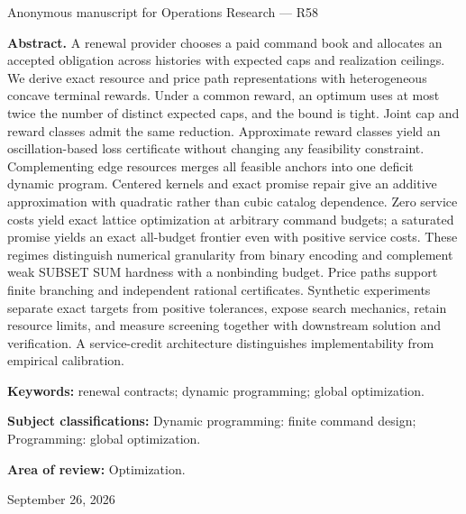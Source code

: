 \documentclass[11pt,letterpaper]{article}
\theoremstyle{definition}\newtheorem{remark}[theorem]{Remark}
\begin{document}
\hypersetup{pageanchor=false}
\begin{titlepage}
\vspace{0.25in}Anonymous manuscript for Operations Research --- R58\par\vspace{0.2in}
\begin{minipage}{\textwidth}\textbf{Abstract.} A renewal provider chooses a paid command book and allocates an accepted obligation across histories with expected caps and realization ceilings. We derive exact resource and price path representations with heterogeneous concave terminal rewards. Under a common reward, an optimum uses at most twice the number of distinct expected caps, and the bound is tight. Joint cap and reward classes admit the same reduction. Approximate reward classes yield an oscillation-based loss certificate without changing any feasibility constraint. Complementing edge resources merges all feasible anchors into one deficit dynamic program. Centered kernels and exact promise repair give an additive approximation with quadratic rather than cubic catalog dependence. Zero service costs yield exact lattice optimization at arbitrary command budgets; a saturated promise yields an exact all-budget frontier even with positive service costs. These regimes distinguish numerical granularity from binary encoding and complement weak SUBSET SUM hardness with a nonbinding budget. Price paths support finite branching and independent rational certificates. Synthetic experiments separate exact targets from positive tolerances, expose search mechanics, retain resource limits, and measure screening together with downstream solution and verification. A service-credit architecture distinguishes implementability from empirical calibration.
\par\vspace{0.15in}\textbf{Keywords:} renewal contracts; dynamic programming; global optimization.
\par\vspace{0.1in}\textbf{Subject classifications:} Dynamic programming: finite command design; Programming: global optimization.
\par\vspace{0.1in}\textbf{Area of review:} Optimization.\end{minipage}\vfill September 26, 2026\end{titlepage}
\hypersetup{pageanchor=true}
\end{document}

